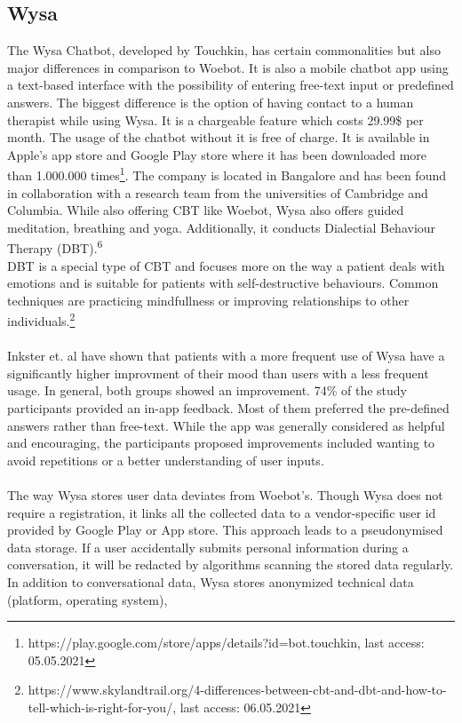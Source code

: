 \documentclass[sigconf, nonacm]{acmart}
\begin{document}
\subsection{Wysa}
The Wysa Chatbot, developed by Touchkin, has certain commonalities but also major differences in comparison to Woebot. It is also a mobile chatbot app using a text-based interface with the possibility of entering 
free-text input or predefined answers. The biggest difference is the option of having contact to 
a human therapist while using Wysa. It is a chargeable feature which costs 29.99\$ per month. The usage of the chatbot without it is free of charge. It is available
in Apple's app store and Google Play store where it has been downloaded more than 1.000.000 times\footnote{https://play.google.com/store/apps/details?id=bot.touchkin, last access: 05.05.2021}. 
The company is located in Bangalore and has been found in collaboration with a research team from the universities of Cambridge and Columbia.
While also offering CBT like Woebot, Wysa also offers guided meditation, breathing and yoga. Additionally, it conducts Dialectial Behaviour Therapy (DBT).\textsuperscript{6} 
\\
DBT is a special type of CBT and focuses more on the way a patient deals with emotions and is suitable for patients with self-destructive behaviours. Common techniques are practicing mindfullness or 
improving relationships to other individuals.\footnote{https://www.skylandtrail.org/4-differences-between-cbt-and-dbt-and-how-to-tell-which-is-right-for-you/, last access: 06.05.2021} 
\\\\
Inkster et. al have shown that patients with a more frequent use of Wysa have a significantly higher improvment of their mood than users
with a less frequent usage. In general, both groups showed an improvement. 74\% of the study participants provided an in-app feedback. Most of them preferred the pre-defined answers rather than free-text.
While the app was generally considered as helpful and encouraging, the participants proposed improvements included wanting to avoid repetitions or a better understanding of user inputs.\cite{Inkster} 
\\\\
The way Wysa stores user data deviates from Woebot's. Though Wysa does not require a registration, it links all the collected data to a vendor-specific user id provided by Google Play or App store. This approach leads to a pseudonymised data storage.
If a user accidentally submits personal information during a conversation, it will be redacted by algorithms scanning the stored data regularly. In addition to conversational data, Wysa stores anonymized technical data (platform, operating system), 
\end{document}
